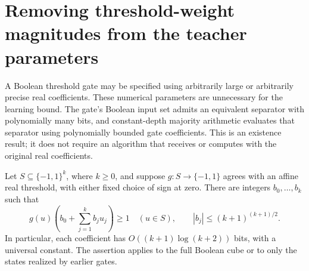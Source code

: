 \section{Removing threshold-weight magnitudes from the teacher parameters}
\label{sec:critical-weight-independent-threshold}

A Boolean threshold gate may be specified using arbitrarily large or
arbitrarily precise real coefficients. These numerical parameters are
unnecessary for the learning bound. The gate's Boolean input set admits
an equivalent separator with polynomially many bits, and constant-depth
majority arithmetic evaluates that separator using polynomially bounded
gate coefficients. This is an existence result; it does not require an
algorithm that receives or computes with the original real coefficients.

\begin{lemma}
\label{lem:critical-small-bit-separator}
Let $S\subseteq\{-1,1\}^k$, where $k\ge0$, and suppose
$g:S\to\{-1,1\}$ agrees with an affine real threshold, with either fixed
choice of sign at zero. There are integers $b_0,\ldots,b_k$ such that
\[
 g(u)\left(b_0+\sum_{j=1}^k b_j u_j\right)\ge1
 \quad(u\in S),\qquad
 |b_j|\le (k+1)^{(k+1)/2}.
\]
In particular, each coefficient has
$O((k+1)\log(k+2))$ bits, with a universal constant.
The assertion applies to the full Boolean cube or to only the states
realized by earlier gates.
\end{lemma}

